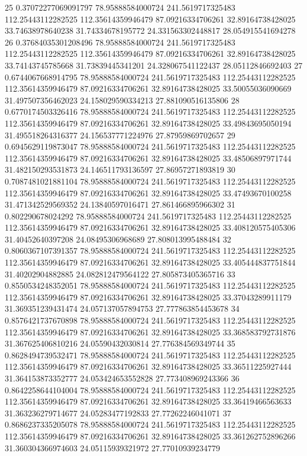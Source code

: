 {25 0.37072277069091797 78.95888584000724 241.5619717325483 112.25443112282525 112.35614359946479 87.09216334706261 32.89164738428025 33.74638978640238 31.74334678195772 24.331563302448817 28.054915541694278
26 0.37684035301208496 78.95888584000724 241.5619717325483 112.25443112282525 112.35614359946479 87.09216334706261 32.89164738428025 33.74143745785668 31.73839445341201 24.328067541122437 28.05112846692403
27 0.6744067668914795 78.95888584000724 241.5619717325483 112.25443112282525 112.35614359946479 87.09216334706261 32.89164738428025 33.50055036090669 31.497507356462023 24.158029590334213 27.881090516135806
28 0.6770174503326416 78.95888584000724 241.5619717325483 112.25443112282525 112.35614359946479 87.09216334706261 32.89164738428025 33.49843695050194 31.495518264316377 24.156537771224976 27.87959869702657
29 0.6945629119873047 78.95888584000724 241.5619717325483 112.25443112282525 112.35614359946479 87.09216334706261 32.89164738428025 33.48506897971744 31.482150293531873 24.146511793136597 27.86957271893819
30 0.7087481021881104 78.95888584000724 241.5619717325483 112.25443112282525 112.35614359946479 87.09216334706261 32.89164738428025 33.47493670100258 31.471342529569352 24.13840597016471 27.861466895966302
31 0.802290678024292 78.95888584000724 241.5619717325483 112.25443112282525 112.35614359946479 87.09216334706261 32.89164738428025 33.408120575405306 31.40452640397208 24.08495306968689 27.808013995488484
32 0.8060367107391357 78.95888584000724 241.5619717325483 112.25443112282525 112.35614359946479 87.09216334706261 32.89164738428025 33.405444837751844 31.40202904882885 24.082812479564122 27.805873405365716
33 0.8550534248352051 78.95888584000724 241.5619717325483 112.25443112282525 112.35614359946479 87.09216334706261 32.89164738428025 33.37043289911179 31.369351239431474 24.057137057894753 27.777863854453678
34 0.8576421737670898 78.95888584000724 241.5619717325483 112.25443112282525 112.35614359946479 87.09216334706261 32.89164738428025 33.368583792731876 31.367625406810216 24.05590432030814 27.776384569349744
35 0.8628494739532471 78.95888584000724 241.5619717325483 112.25443112282525 112.35614359946479 87.09216334706261 32.89164738428025 33.36511225927444 31.364153873352777 24.053424653552828 27.773408969243366
36 0.8642258644104004 78.95888584000724 241.5619717325483 112.25443112282525 112.35614359946479 87.09216334706261 32.89164738428025 33.36419466563633 31.363236279714677 24.05283477192833 27.77262246041071
37 0.8686237335205078 78.95888584000724 241.5619717325483 112.25443112282525 112.35614359946479 87.09216334706261 32.89164738428025 33.361262752896266 31.360304366974603 24.05115939321972 27.77010939234779
}
